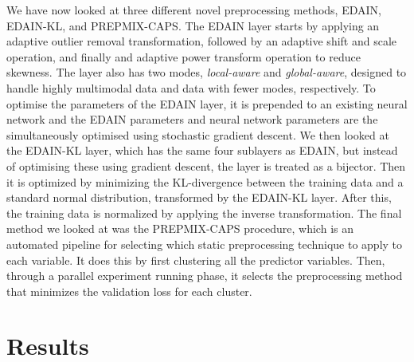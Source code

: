 \documentclass{statsmsc}
\begin{document}
{We have now looked at three different novel preprocessing methods,
\ac{EDAIN}, \ac{EDAIN-KL}, and \ac{PREPMIX-CAPS}. The \ac{EDAIN} layer starts by applying
an adaptive outlier removal transformation, followed by an adaptive shift and scale operation,
and finally and adaptive power transform operation to reduce skewness. The layer also has
two modes, \textit{local-aware} and \textit{global-aware}, designed to handle highly
multimodal data and data with fewer modes, respectively. To optimise the parameters of
the \ac{EDAIN} layer, it is prepended to an existing neural network and the
\ac{EDAIN} parameters and neural network parameters are the simultaneously optimised using
stochastic gradient descent. We then looked at the \ac{EDAIN-KL} layer, which has the same
four sublayers as \ac{EDAIN}, but instead of optimising these using gradient descent, the layer
is treated as a bijector. Then it is optimized by minimizing the \ac{KL-divergence} between the
training data and a standard  normal distribution, transformed by the \ac{EDAIN-KL} layer.
After this, the training data is normalized by applying the inverse transformation.
The final method we looked at was the \ac{PREPMIX-CAPS} procedure, which is an automated
pipeline for selecting which static preprocessing technique to apply to each variable. It does this
by first clustering all the predictor variables. Then, through a parallel experiment
running phase, it selects the preprocessing method that minimizes the validation loss for each
cluster.


\chapter{Results} %


}
\end{document}
